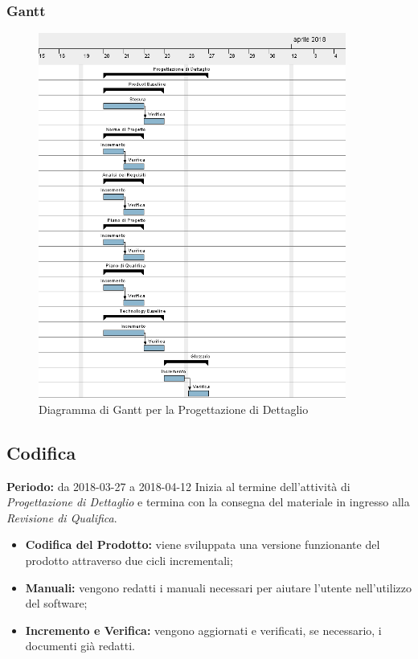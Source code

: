 \subsubsection{Gantt}
\begin{figure}[H]
	\centering 
	\includegraphics[width=0.9\textwidth]{images/Progettazione-Dettaglio.png}
	\caption{Diagramma di Gantt per la Progettazione di Dettaglio}
	\label{graficobello4} 
\end{figure}
\subsection{Codifica}
    \textbf{Periodo:} da 2018-03-27 a 2018-04-12\Spazio
    Inizia al termine dell'attività di \emph{Progettazione di Dettaglio} e termina con la consegna del materiale in ingresso alla \emph{Revisione di Qualifica}.
    \begin{itemize}
    	\item \textbf{Codifica del Prodotto:} viene sviluppata una versione funzionante del prodotto attraverso due cicli incrementali;
    	\item \textbf{Manuali:} vengono redatti i manuali necessari per aiutare l'utente nell'utilizzo del software;
    	\item \textbf{Incremento e Verifica:} vengono aggiornati e verificati, se necessario, i documenti già redatti.
    \end{itemize}
